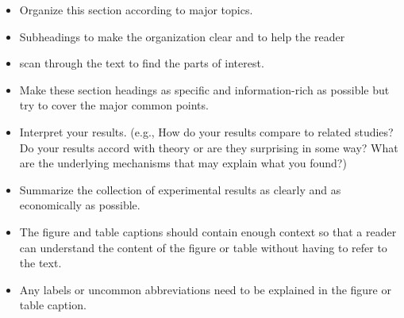 \begin{itemize}
\item Organize this section according to major topics. 
\item Subheadings to make the organization clear and to help the reader \item scan through the text to find the parts of interest.
\item Make these section headings as specific and information-rich as possible but try to cover the major common points.
\item Interpret your results. (e.g., How do your results compare to related studies? Do your results accord with theory or are they surprising in some way? What are the underlying mechanisms that may explain what you found?)
\item Summarize the collection of experimental results as clearly and as economically as possible. 
\item The figure and table captions should contain enough context so that a reader can understand the content of the figure or table without having to refer to the text.
\item Any labels or uncommon abbreviations need to be explained in the figure or table caption.
\end{itemize}


